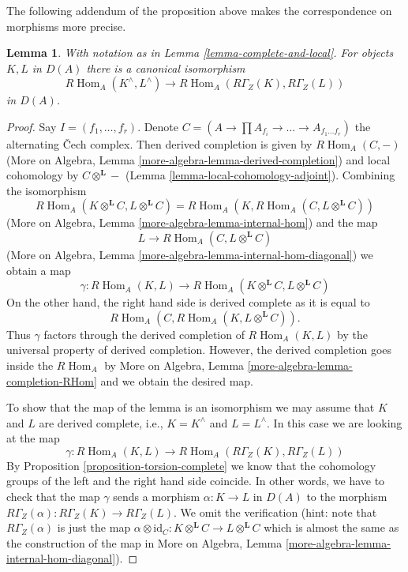 \documentclass{stacks-project}
\theoremstyle{plain}
\newtheorem{lemma}[subsection]{Lemma}
\theoremstyle{definition}
\theoremstyle{remark}
\numberwithin{equation}{subsection}
\def\Hom{\mathop{\mathrm{Hom}}\nolimits}
\begin{document}
\noindent
The following addendum of the proposition above makes the
correspondence on morphisms more precise.

\begin{lemma}
\label{lemma-compare-RHom}
With notation as in Lemma \ref{lemma-complete-and-local}.
For objects $K, L$ in $D(A)$ there is a canonical isomorphism
$$
R\Hom_A(K^\wedge, L^\wedge) \longrightarrow R\Hom_A(R\Gamma_Z(K), R\Gamma_Z(L))
$$
in $D(A)$.
\end{lemma}

\begin{proof}
Say $I = (f_1, \ldots, f_r)$. Denote
$C = (A \to \prod A_{f_i} \to \ldots \to A_{f_1 \ldots f_r})$ the
alternating {\v C}ech complex. Then derived completion is given by
$R\Hom_A(C, -)$ (More on Algebra, Lemma
\ref{more-algebra-lemma-derived-completion}) and local cohomology by
$C \otimes^\mathbf{L} -$ (Lemma \ref{lemma-local-cohomology-adjoint}).
Combining the isomorphism
$$
R\Hom_A(K \otimes^\mathbf{L} C, L \otimes^\mathbf{L} C) =
R\Hom_A(K, R\Hom_A(C,  L \otimes^\mathbf{L} C))
$$
(More on Algebra, Lemma \ref{more-algebra-lemma-internal-hom})
and the map
$$
L \to R\Hom_A(C,  L \otimes^\mathbf{L} C)
$$
(More on Algebra, Lemma \ref{more-algebra-lemma-internal-hom-diagonal})
we obtain a map
$$
\gamma :
R\Hom_A(K, L)
\longrightarrow
R\Hom_A(K \otimes^\mathbf{L} C, L \otimes^\mathbf{L} C)
$$
On the other hand, the right hand side is derived complete as it is
equal to
$$
R\Hom_A(C, R\Hom_A(K, L \otimes^\mathbf{L} C)).
$$
Thus $\gamma$ factors through the derived completion of
$R\Hom_A(K, L)$ by the universal property of derived completion.
However, the derived completion goes inside the $R\Hom_A$ by
More on Algebra, Lemma \ref{more-algebra-lemma-completion-RHom}
and we obtain the desired map.

\medskip\noindent
To show that the map of the lemma is an isomorphism
we may assume that $K$ and $L$ are derived complete, i.e.,
$K = K^\wedge$ and $L = L^\wedge$. In this case we are
looking at the map
$$
\gamma : R\Hom_A(K, L) \longrightarrow R\Hom_A(R\Gamma_Z(K), R\Gamma_Z(L))
$$
By Proposition \ref{proposition-torsion-complete} we know that
the cohomology groups
of the left and the right hand side coincide. In other words,
we have to check that the map $\gamma$ sends a morphism
$\alpha : K \to L$ in $D(A)$ to the morphism
$R\Gamma_Z(\alpha) : R\Gamma_Z(K) \to R\Gamma_Z(L)$.
We omit the verification (hint: note that $R\Gamma_Z(\alpha)$
is just the map
$\alpha \otimes \text{id}_C :
K \otimes^\mathbf{L} C
\to
L \otimes^\mathbf{L} C$ which is almost the same as the
construction of the map in
More on Algebra, Lemma \ref{more-algebra-lemma-internal-hom-diagonal}).
\end{proof}
\end{document}
